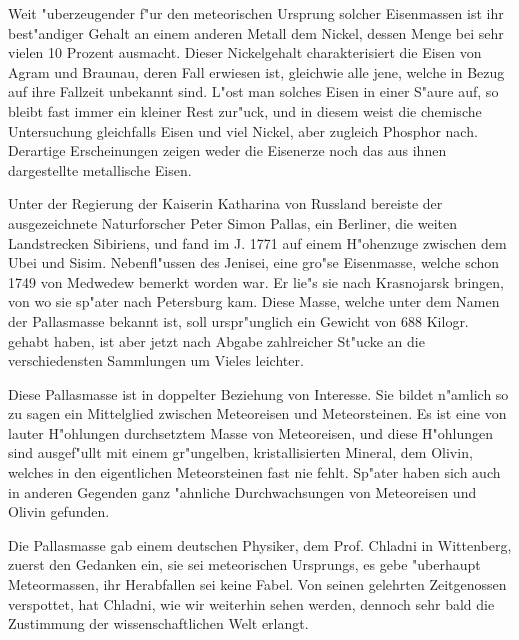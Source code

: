 \documentclass[a4paper, 11pt, oneside, german]{article}
\begin{document}
Weit "uberzeugender f"ur den meteorischen Ursprung solcher Eisenmassen ist ihr best"andiger Gehalt an einem anderen Metall dem Nickel, dessen Menge bei sehr vielen 10 Prozent ausmacht. Dieser Nickelgehalt charakterisiert die Eisen von Agram und Braunau, deren Fall erwiesen ist, gleichwie alle jene, welche in Bezug auf ihre Fallzeit unbekannt sind. L"ost man solches Eisen in einer S"aure auf, so bleibt fast immer ein kleiner Rest zur"uck, und in diesem weist die chemische Untersuchung gleichfalls Eisen und viel Nickel, aber zugleich Phosphor nach. Derartige Erscheinungen zeigen weder die Eisenerze noch das aus ihnen dargestellte metallische Eisen.

Unter der Regierung der Kaiserin Katharina von Russland bereiste der ausgezeichnete Naturforscher Peter Simon Pallas, ein Berliner, die weiten Landstrecken Sibiriens, und fand im J. 1771 auf einem H"ohenzuge zwischen dem Ubei und Sisim. Nebenfl"ussen des Jenisei, eine gro"se Eisenmasse, welche schon 1749 von Medwedew bemerkt worden war. Er lie"s sie nach Krasnojarsk bringen, von wo sie sp"ater nach Petersburg kam. Diese Masse, welche unter dem Namen der Pallasmasse bekannt ist, soll urspr"unglich ein Gewicht von 688 Kilogr. gehabt haben, ist aber jetzt nach Abgabe zahlreicher St"ucke an die verschiedensten Sammlungen um Vieles leichter.

Diese Pallasmasse ist in doppelter Beziehung von Interesse. Sie bildet n"amlich so zu sagen ein Mittelglied zwischen Meteoreisen und Meteorsteinen. Es ist eine von lauter H"ohlungen durchsetztem Masse von Meteoreisen, und diese H"ohlungen sind ausgef"ullt mit einem gr"ungelben, kristallisierten Mineral, dem Olivin, welches in den eigentlichen Meteorsteinen fast nie fehlt. Sp"ater haben sich auch in anderen Gegenden ganz "ahnliche Durchwachsungen von Meteoreisen und Olivin gefunden.

Die Pallasmasse gab einem deutschen Physiker, dem Prof. Chladni in Wittenberg, zuerst den Gedanken ein, sie sei meteorischen Ursprungs, es gebe "uberhaupt Meteormassen, ihr Herabfallen sei keine Fabel. Von seinen gelehrten Zeitgenossen verspottet, hat Chladni, wie wir weiterhin sehen werden, dennoch sehr bald die Zustimmung der wissenschaftlichen Welt erlangt.
\end{document}
